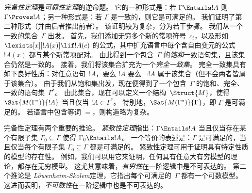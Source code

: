 \emph{完备性定理}是\emph{可靠性定理}的逆命题。
它的一种形式是：若 $\Gamma \Entails !A$ 则 $\Gamma \Proves !A$；另一种形式是：若 $\Gamma$ 是一致的，则它是可满足的。
我们证明了第二种形式（并由后者推出前者）。
该证明较为复杂，分为若干步骤。
我们从一个一致的集合~$\Gamma$ 出发。
首先，我们添加无穷多个新的常项符号~$c_i$，以及形如 $\lexists[x][!A(x)] \lif !A(c)$ 的公式，其中扩充语言中每个含自由变元的公式~$!A(x)$ 都与某个新常项配对。
由此得到一个包含~$\Gamma$ 的\emph{饱和}一致语句集，且该集合仍然是一致的。
接着，我们将该集合扩充为一个\emph{完全一致集}。
完全一致集具有如下良好性质：对任意语句~$!A$，要么 $!A$ 要么 $\lnot !A$ 属于该集合（但不会两者皆属于该集合）。
由于我们从饱和集出发，现在便得到了一个包含~$\Gamma$ 的饱和、完全、一致的语句集~$\Gamma^*$。
由此集合，现在可以定义一个结构~$\Struct{M}$，使得 $\Sat{M(\Gamma^*)}{!A}$ 当且仅当 $!A \in \Gamma^*$。
特别地，$\Sat{M(\Gamma^*)}{\Gamma}$，即 $\Gamma$ 是可满足的。
若语言中包含等词 $=$，则构造略为复杂。

完备性定理有两个重要的推论。
\emph{紧致性定理}指出：$\Gamma \Entails !A$ 当且仅当存在某个有限子集 $\Gamma_0 \subseteq \Gamma$ 使得 $\Gamma_0 \Entails !A$。
一个等价的表述是：$\Gamma$ 是可满足的，当且仅当每个有限子集 $\Gamma_0 \subseteq \Gamma$ 都是可满足的。
紧致性定理可用于证明具有特定性质的模型的存在性。
例如，我们可以用它来证明，任何具有任意大有穷模型的理论，都存在无穷模型。
这尤其意味着，\emph{有穷性}在一阶逻辑中是不可表达的。
第二个推论是 \emph{Löwenheim-Skolem}定理，它指出每个可满足的~$\Gamma$ 都有一个可数模型。
这进而表明，\emph{不可数性}在一阶逻辑中也是不可表达的。